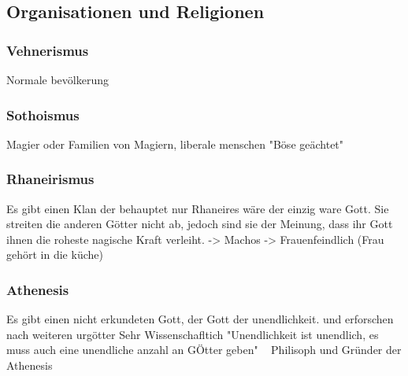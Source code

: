 \subsection{Organisationen und Religionen}


\subsubsection{Vehnerismus}

Normale bevölkerung

\subsubsection{Sothoismus}

Magier oder Familien von Magiern, liberale menschen "Böse geächtet"

\subsubsection{Rhaneirismus}

Es gibt einen Klan der behauptet nur Rhaneires wäre der einzig ware Gott. Sie streiten die anderen Götter nicht ab, jedoch sind sie der Meinung, dass ihr Gott ihnen die roheste nagische Kraft verleiht.
-> Machos
-> Frauenfeindlich (Frau gehört in die küche)

\subsubsection{Athenesis}
Es gibt einen nicht erkundeten Gott, der Gott der unendlichkeit. und erforschen nach weiteren urgötter
Sehr Wissenschafltich
"Unendlichkeit ist unendlich, es muss auch eine unendliche anzahl an GÖtter geben" ~ Philisoph und Gründer der Athenesis

\newpage
